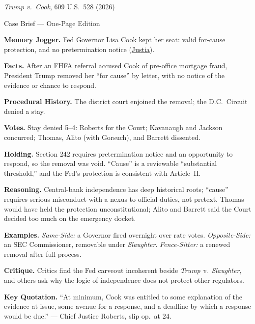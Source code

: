 \documentclass[12pt]{article}
\begin{document}
\begin{center}
{\Large \textit{Trump v.\ Cook}, 609 U.S.\ 528 (2026)\par}
\vspace{0.3em}
{\normalsize Case Brief --- One-Page Edition\par}
\end{center}

\textbf{Memory Jogger.} Fed Governor Lisa Cook kept her seat: valid for-cause protection, and no pretermination notice (\href{https://supreme.justia.com/cases/federal/us/609/25a312/}{Justia}).

\textbf{Facts.} After an FHFA referral accused Cook of pre-office mortgage fraud, President Trump removed her ``for cause'' by letter, with no notice of the evidence or chance to respond.

\textbf{Procedural History.} The district court enjoined the removal; the D.C.\ Circuit denied a stay.

\textbf{Votes.} Stay denied 5--4: Roberts for the Court; Kavanaugh and Jackson concurred; Thomas, Alito (with Gorsuch), and Barrett dissented.

\textbf{Holding.} Section 242 requires pretermination notice and an opportunity to respond, so the removal was void. ``Cause'' is a reviewable ``substantial threshold,'' and the Fed's protection is consistent with Article~II.

\textbf{Reasoning.} Central-bank independence has deep historical roots; ``cause'' requires serious misconduct with a nexus to official duties, not pretext. Thomas would have held the protection unconstitutional; Alito and Barrett said the Court decided too much on the emergency docket.

\textbf{Examples.} \emph{Same-Side:} a Governor fired overnight over rate votes. \emph{Opposite-Side:} an SEC Commissioner, removable under \textit{Slaughter}. \emph{Fence-Sitter:} a renewed removal after full process.

\textbf{Critique.} Critics find the Fed carveout incoherent beside \textit{Trump v.\ Slaughter}, and others ask why the logic of independence does not protect other regulators.

\textbf{Key Quotation.} ``At minimum, Cook was entitled to some explanation of the evidence at issue, some avenue for a response, and a deadline by which a response would be due.'' --- Chief Justice Roberts, slip op.\ at 24.
\end{document}
